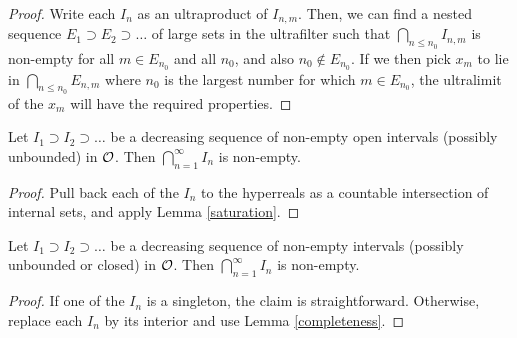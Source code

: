 \begin{proof}  Write each $I_n$ as an ultraproduct of $I_{n,m}$.  Then, we can find a nested sequence $E_1 \supset E_2 \supset \dots$ of large sets in the ultrafilter such that $\bigcap_{n \leq n_0} I_{n,m}$ is non-empty for all $m \in E_{n_0}$ and all $n_0$, and also $n_0 \not \in E_{n_0}$.  If we then pick $x_m$ to lie in $\bigcap_{n \leq n_0} E_{n,m}$ where $n_0$ is the largest number for which $m \in E_{n_0}$, the ultralimit of the $x_m$ will have the required properties.
\end{proof}

\begin{lemma}[Completeness]\label{completeness} Let $I_1 \supset I_2 \supset \dots$ be a decreasing sequence of non-empty open intervals (possibly unbounded) in ${\mathcal O}$.  Then $\bigcap_{n=1}^\infty I_n$ is non-empty.
\end{lemma}

\begin{proof} Pull back each of the $I_n$ to the hyperreals as a countable intersection of internal sets, and apply Lemma \ref{saturation}.
\end{proof}

\begin{lemma}[Completeness, II]\label{completeness-2} Let $I_1 \supset I_2 \supset \dots$ be a decreasing sequence of non-empty intervals (possibly unbounded or closed) in ${\mathcal O}$.  Then $\bigcap_{n=1}^\infty I_n$ is non-empty.
\end{lemma}

\begin{proof}   If one of the $I_n$ is a singleton, the claim is straightforward.  Otherwise, replace each $I_n$ by its interior and use Lemma \ref{completeness}.
\end{proof}


